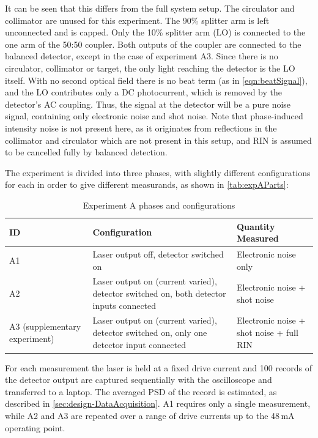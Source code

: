  It can be seen that this differs from the full system setup. The circulator and collimator are unused for this experiment. The 90\% splitter arm is left unconnected and is capped. Only the 10\% splitter arm (LO) is connected to the one arm of the 50:50 coupler. Both outputs of the coupler are connected to the balanced detector, except in the case of experiment A3. Since there is no circulator, collimator or target, the only light reaching the detector is the LO itself. With no second optical field there is no beat term (as in \autoref{eqn:beatSignal}), and the LO contributes only a DC photocurrent, which is removed by the detector's AC coupling. Thus, the signal at the detector will be a pure noise signal, containing only electronic noise and shot noise. Note that phase-induced intensity noise is not present here, as it originates from reflections in the collimator and circulator which are not present in this setup, and RIN is assumed to be cancelled fully by balanced detection.

 The experiment is divided into three phases, with slightly different configurations for each in order to give different measurands, as shown in \autoref{tab:expAParts}:

 \begin{table}[H]
     \centering
     \begin{tabular}{|p{3.5cm}|p{7cm}|p{5cm}|}
     \hline
         \textbf{ID} & \textbf{Configuration} & \textbf{Quantity Measured} \\ \hline
          A1 & Laser output off, detector switched on & Electronic noise only \\ \hline
          A2 & Laser output on (current varied), detector switched on, both detector inputs connected & Electronic noise + shot noise \\ \hline
          A3 (supplementary experiment) & Laser output on (current varied), detector switched on, only one detector input connected & Electronic noise + shot noise + full RIN \\ \hline
     \end{tabular}
     \caption{Experiment A phases and configurations}
     \label{tab:expAParts}
 \end{table}

 For each measurement the laser is held at a fixed drive current and
 100 records of the detector output are captured sequentially with the oscilloscope and transferred to a laptop. The averaged PSD of the record is estimated, as described in \autoref{sec:design-DataAcquisition}. A1 requires only a single measurement, while A2 and A3 are repeated over a range of drive
 currents up to the 48\,mA operating point.
 
